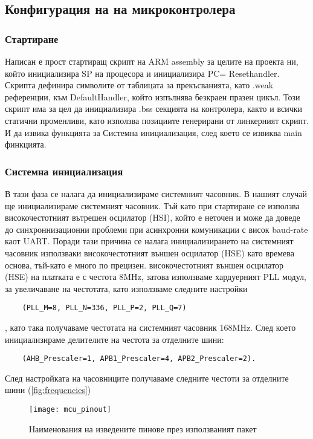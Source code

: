 \subsection{Конфигурация на на микроконтролера}

\subsubsection{Стартиране }

Написан е прост стартиращ скрипт на ARM assembly за целите на проекта ни, който инициализира SP на процесора и инициализира PC= Resethandler.
Скрипта дефинира символите от таблицата за прекъсванията, като .weak референции, към DefaultHandler, който изпълнява безкраен празен цикъл.
Този скрипт има за цел да инициализира .bss секцията на контролера,
както и всички статични променливи, като използва позициите генерирани от линкерният скрипт.
И да извика функцията за Системна инициализация, след което се извиква main финкцията.

\subsubsection{Системна инициализация}

В тази фаза се налага да инициализираме системният часовник.
В нашият случай ще инициализираме системният часовник. 
Тъй като при стартиране се използва високочестотният вътрешен осцилатор (HSI), който е
неточен и може да доведе до синхроннизационни проблеми при асинхронни комуникации 
с висок baud-rate каот UART.
Поради тази причина се налага инициализирането на системният часовник използваки 
високочестотният външен осцилатор (HSE) като времева основа, тъй-като е много по прецизен.
високочестотният външен осцилатор (HSE) на платката е с честота 8MHz, затова използваме
хардуерният PLL модул, за увеличаване на честотата, като използваме следните настройки 
\begin{verbatim}
    (PLL_M=8, PLL_N=336, PLL_P=2, PLL_Q=7)
\end{verbatim}
, като така получаваме честотата на системният часовник 168MHz.
След което инициализираме делителите на честота за отделните шини:
\begin{verbatim}
    (AHB_Prescaler=1, APB1_Prescaler=4, APB2_Prescaler=2).
\end{verbatim}
След настройката на часовниците получаваме следните честоти за отделните шини (\autoref{fig:frequencies})

\begin{figure}[htpb!]
    \centering
    \texttt{[image: mcu\_pinout]}
    \caption{Наименования на изведените пинове през използваният пакет}
    \label{fig:frequencies}
\end{figure}
 

